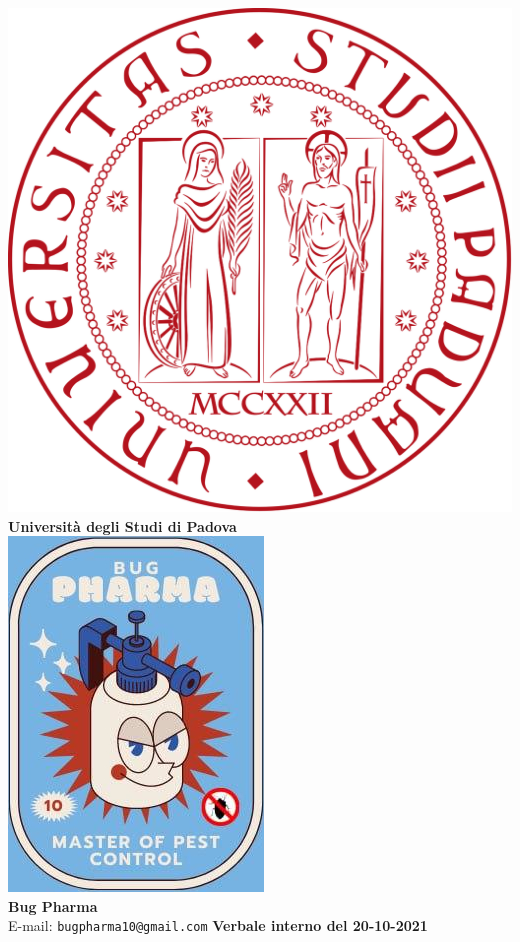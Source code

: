 \documentclass[11pt]{article}
\begin{document}
	\thispagestyle{empty}
	\begin{titlepage}
		\begin{center}
			\includegraphics[scale = 0.05]{../../logo_unipd.png}\\
			\large \textbf{Università degli Studi di Padova} \\
			\vfill
			\includegraphics[scale = 0.7]{../../logo_small.jpg}\\
			\large \textbf{Bug Pharma} \\
			\vfill
			\large
			E-mail: 
			\texttt{bugpharma10@gmail.com}
			\vfill
			\Huge \textbf{Verbale interno del 20-10-2021}\\
			

\end{center}
\end{titlepage}
\end{document}

